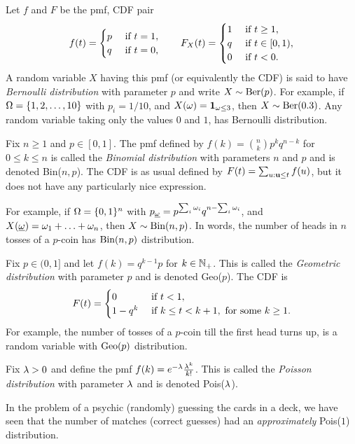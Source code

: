 \documentclass[preprint,  11pt]{amsart}
\def\omeg{\underline{\ome}}
\begin{document}
\beg Let $f$ and $F$ be the pmf, CDF pair
$$
f(t)=\begin{cases}p & \mbox{ if }t=1, \\ q & \mbox{ if }t=0, \end{cases} \qquad F_{X}(t)=\begin{cases} 1 &\mbox{ if } t\ge 1, \\ q & \mbox{ if }t\in [0,1), \\ 0 & \mbox{ if }t< 0. \end{cases}
$$
A random variable $X$ having this pmf (or equivalently the CDF) is said to have {\em Bernoulli distribution} with parameter $p$ and  write $X\sim \mbox{Ber}(p)$. For example, if $\Omega=\{1,2,\ldots ,10\}$ with $p_{i}=1/10$, and $X(\omega)={\mathbf 1}_{\omega\le 3}$, then $X\sim \mbox{Ber}(0.3)$. Any random variable taking only the values $0$ and $1$, has Bernoulli distribution.
\eeg

\beg  Fix $n\ge 1$ and $p\in [0,1]$. The pmf defined by $f(k)=\binom{n}{k}p^{k}q^{n-k}$ for $0\le k\le n$ is called the {\em Binomial  distribution} with parameters $n$ and $p$ and is denoted Bin($n,p$). The CDF is as usual defined by $F(t)=\sum_{u:\mathbf{u}\le t}f(u)$, but it does not have any particularly nice expression.

For example, if $\Omega=\{0,1\}^{n}$ with $p_{\omeg}=p^{\sum_{i}\ome_{i}}q^{n-\sum_{i}\ome_{i}}$, and $X(\omeg)=\ome_{1}+\ldots +\ome_{n}$, then $X\sim \mbox{Bin}(n,p)$. In words, the number of heads in $n$ tosses of a $p$-coin has $\mbox{Bin}(n,p)$ distribution.
\eeg

\beg Fix $p\in (0,1]$ and let $f(k)=q^{k-1}p$ for $k\in \mathbb{N}_{+}$. This is called the {\em Geometric  distribution} with parameter $p$ and is denoted Geo($p$). The CDF is
$$
F(t) = \begin{cases}
0 & \mbox{ if } t<1, \\
1-q^{k} & \mbox{ if } k\le t<k+1, \mbox{ for some }k\ge 1.
\end{cases}
$$
For example, the number of tosses of a $p$-coin till the first head turns up, is a random variable with $\mbox{Geo}(p)$ distribution.
\eeg

\beg Fix $\lambda>0$ and define the pmf $f(k)=e^{-\lambda}\frac{\lambda^{k}}{k!}$. This is called the {\em Poisson  distribution} with parameter $\lambda$ and is denoted Pois($\lambda$).

In the problem of a psychic (randomly) guessing the cards in a deck, we have seen that the number of matches (correct guesses) had an {\em approximately} Pois($1$) distribution.
\eeg
\end{document}
